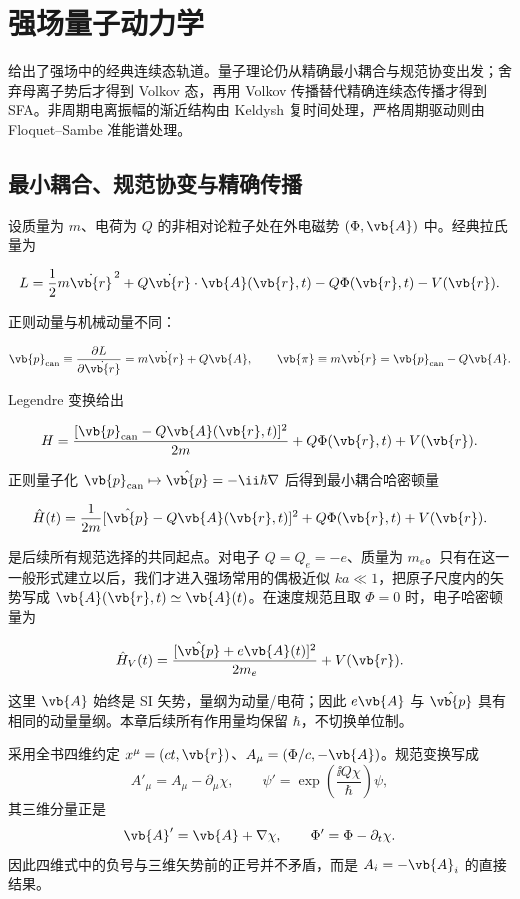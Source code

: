 \section{强场量子动力学}
\label{ch:gauge-volkov-sfa}

给出了强场中的经典连续态轨道。量子理论仍从精确最小耦合与规范协变出发；舍弃母离子势后才得到 Volkov 态，再用 Volkov 传播替代精确连续态传播才得到 SFA。非周期电离振幅的渐近结构由 Keldysh 复时间处理，严格周期驱动则由 Floquet--Sambe 准能谱处理。
\subsection{最小耦合、规范协变与精确传播}

设质量为 \(m\)、电荷为 \(Q\) 的非相对论粒子处在外电磁势 \((\Phi,\vb{A})\) 中。经典拉氏量为

\[
L=\frac12m\dot{\vb{r}}^{\,2}
+Q\dot{\vb{r}}\cdot\vb{A}(\vb{r},t)
-Q\Phi(\vb{r},t)-V(\vb{r}).
\]

正则动量与机械动量不同：

\[
\vb{p}_{\rm can}
\equiv\frac{\partial L}{\partial\dot{\vb{r}}}
=m\dot{\vb{r}}+Q\vb{A},
\qquad
\vb{\pi}\equiv m\dot{\vb{r}}
=\vb{p}_{\rm can}-Q\vb{A}.
\]

Legendre 变换给出

\[
H
=\frac{[\vb{p}_{\rm can}-Q\vb{A}(\vb{r},t)]^2}{2m}
+Q\Phi(\vb{r},t)+V(\vb{r}).
\]

正则量子化 \(\vb{p}_{\rm can}\mapsto\hat{\vb{p}}=-\ii\hbar\nabla\) 后得到最小耦合哈密顿量

\begin{equation}
\hat H(t)
=\frac{1}{2m}
[\hat{\vb{p}}-Q\vb{A}(\vb{r},t)]^2
+Q\Phi(\vb{r},t)+V(\vb{r}).
\label{eq:minimal-coupling}
\end{equation}

是后续所有规范选择的共同起点。对电子 \(Q=Q_e=-e\)、质量为 \(m_e\)。只有在这一一般形式建立以后，我们才进入强场常用的偶极近似 \(k a\ll1\)，把原子尺度内的矢势写成 \(\vb{A}(\vb{r},t)\simeq\vb{A}(t)\)。在速度规范且取 \(\Phi=0\) 时，电子哈密顿量为

\[
\hat H_V(t)
=\frac{[\hat{\vb{p}}+e\vb{A}(t)]^2}{2m_e}+V(\vb{r}).
\]

这里 \(\vb{A}\) 始终是 SI 矢势，量纲为动量/电荷；因此 \(e\vb{A}\) 与 \(\hat{\vb{p}}\) 具有相同的动量量纲。本章后续所有作用量均保留 \(\hbar\)，不切换单位制。

采用全书四维约定 $x^\mu=(ct,\vb{r})$、$A_\mu=(\Phi/c,-\vb{A})$。规范变换写成
\begin{equation}
A'_\mu=A_\mu-\partial_\mu\chi,
\qquad
\psi'=\exp\!\left(\frac{\ii Q\chi}{\hbar}\right)\psi,
\label{eq:strong-gauge-covariant-transform}
\end{equation}
其三维分量正是
\[
\vb{A}'=\vb{A}+\nabla\chi,
\qquad
\Phi'=\Phi-\partial_t\chi.
\]
因此四维式中的负号与三维矢势前的正号并不矛盾，而是 $A_i=-\vb{A}_i$ 的直接结果。

